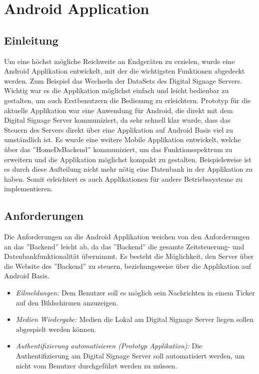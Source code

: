 \chapter{Android Application}
\section{Einleitung}
Um eine höchst mögliche Reichweite an Endgeräten zu erzielen, wurde eine Android Applikation entwickelt, mit der die wichtigsten Funktionen abgedeckt werden. Zum Beispiel das Wechseln der DataSets des Digital Signage Servers. Wichtig war es die Applikation möglichst einfach und leicht bedienbar zu gestalten, um auch Erstbenutzern die Bedienung zu erleichtern. 
Prototyp für die aktuelle Applikation war eine Anwendung für Android, die direkt mit dem Digital Signage Server kommuniziert, da sehr schnell klar wurde, dass das Steuern des Servers direkt über eine Applikation auf Android Basis viel zu umständlich ist. Es wurde eine weitere Mobile Applikation entwickelt, welche über das ''HomeDsBackend'' kommuniziert, um das Funktionsspektrum zu erweitern und die Applikation möglichst kompakt zu gestalten. Beispielsweise ist es durch diese Aufteilung nicht mehr nötig eine Datenbank in der Applikation zu haben. Somit erleichtert es auch Applikationen für andere Betriebssysteme zu implementieren. 


\section{Anforderungen}
Die Anforderungen an die Android Applikation weichen von den Anforderungen an das ''Backend'' leicht ab, da das ''Backend'' die gesamte Zeitsteuerung- und Datenbankfunktionalität übernimmt. Es besteht die Möglichkeit, den Server über die Website des ''Backend'' zu steuern, beziehungsweise über die Applikation auf Android Basis. 

\begin{itemize}
	\item {\em Eilmeldungen:} Dem Benutzer soll es möglich sein Nachrichten in einem Ticker auf den Bildschirmen anzuzeigen.
	
	\item {\em Medien Wiedergabe:} Medien die Lokal am Digital Signage Server liegen sollen abgespielt werden können.
		
	\item {\em Authentifizierung automatisieren (Prototyp Applikation):} Die Authentifizierung am Digital Signage Server soll automatisiert werden, um nicht vom Benutzer durchgeführt werden zu müssen.  
		
\end{itemize}

